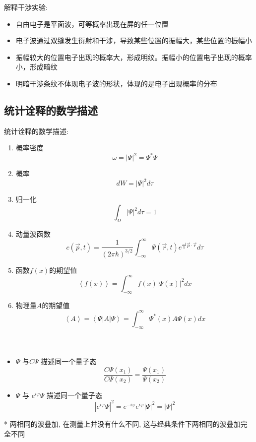 \begin{frame}
    \frametitle{}
    解释干涉实验:
    \begin{itemize}
         \item 自由电子是平面波，可等概率出现在屏的任一位置
         \item 电子波通过双缝发生衍射和干涉，导致某些位置的振幅大，某些位置的振幅小
         \item 振幅较大的位置电子出现的概率大，形成明纹。振幅小的位置电子出现的概率小，形成暗纹
         \item 明暗干涉条纹不体现电子波的形状，体现的是电子出现概率的分布
    \end{itemize}  
\end{frame}

\subsection{统计诠释的数学描述}

\begin{frame}[allowframebreaks=]
    统计诠释的数学描述:
    \begin{enumerate}
         \item 概率密度 \[\omega = |\Psi|^2 =\Psi^* \Psi \]
         \item 概率  \[ d W = |\Psi|^2 d \tau \]
         \item 归一化 \[ \int_{\Omega} |\Psi|^2 d \tau =1 \]
         \item 动量波函数 \[ c(\vec{p},t)=\frac{1}{(2\pi\hbar)^{3/2}} \int_{-\infty}^{\infty} \Psi(\vec{r},t) e^{\frac{-i}{\hbar} \vec{p}\cdot \vec{r} } d \tau \] 
         \item 函数$f (x)$的期望值   \[ \left\langle f(x) \right\rangle=\int_{-\infty}^{\infty} f(x) |\Psi(x)|^2 dx \]
    \item 物理量$A$的期望值 \[ \left\langle A \right\rangle = \left\langle \Psi \left| A \right|\Psi \right\rangle =\int_{-\infty}^{\infty} \Psi^*(x) A \Psi(x) dx \]
    \end{enumerate}
\end{frame}

\begin{frame}
    \frametitle{}
    \Tips \\
    \begin{itemize}
         \item $\Psi$ 与$C\Psi$ 描述同一个量子态 
        \[ \frac{C\Psi(x_1)}{C\Psi(x_2)} = \frac{\Psi(x_1)}{\Psi(x_2)}\]
         \item $\Psi$ 与 $e^{i\varphi}\Psi$ 描述同一个量子态 
         \[ |e^{i\varphi}\Psi|^2 = e^{-i\varphi} e^{i\varphi} |\Psi|^2 = |\Psi|^2 \] 
    \end{itemize}  
    * 两相同的波叠加, 在测量上并没有什么不同, 这与经典条件下两相同的波叠加完全不同
\end{frame}

